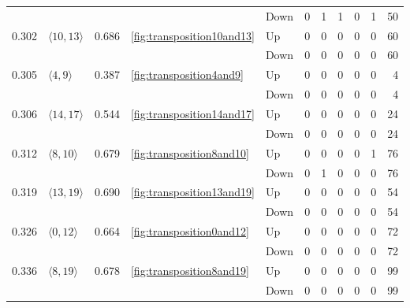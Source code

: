 \documentclass{article}
\begin{document}
\begin{center}
\begin{tabular}{lllllrrrrrr}
 &  &  &  & Down & 0 & 1 & 1 & 0 & 1 & 50 \\
\cline{1-11} \cline{2-11} \cline{3-11} \cline{4-11}
\multirow[t]{2}{*}{0.302} & \multirow[t]{2}{*}{$\langle10, 13\rangle$} & \multirow[t]{2}{*}{0.686} & \multirow[t]{2}{*}{\ref{fig:transposition10and13}} & Up & 0 & 0 & 0 & 0 & 0 & 60 \\
 &  &  &  & Down & 0 & 0 & 0 & 0 & 0 & 60 \\
\cline{1-11} \cline{2-11} \cline{3-11} \cline{4-11}
\multirow[t]{2}{*}{0.305} & \multirow[t]{2}{*}{$\langle4, 9\rangle$} & \multirow[t]{2}{*}{0.387} & \multirow[t]{2}{*}{\ref{fig:transposition4and9}} & Up & 0 & 0 & 0 & 0 & 0 & 4 \\
 &  &  &  & Down & 0 & 0 & 0 & 0 & 0 & 4 \\
\cline{1-11} \cline{2-11} \cline{3-11} \cline{4-11}
\multirow[t]{2}{*}{0.306} & \multirow[t]{2}{*}{$\langle14, 17\rangle$} & \multirow[t]{2}{*}{0.544} & \multirow[t]{2}{*}{\ref{fig:transposition14and17}} & Up & 0 & 0 & 0 & 0 & 0 & 24 \\
 &  &  &  & Down & 0 & 0 & 0 & 0 & 0 & 24 \\
\cline{1-11} \cline{2-11} \cline{3-11} \cline{4-11}
\multirow[t]{2}{*}{0.312} & \multirow[t]{2}{*}{$\langle8, 10\rangle$} & \multirow[t]{2}{*}{0.679} & \multirow[t]{2}{*}{\ref{fig:transposition8and10}} & Up & 0 & 0 & 0 & 0 & 1 & 76 \\
 &  &  &  & Down & 0 & 1 & 0 & 0 & 0 & 76 \\
\cline{1-11} \cline{2-11} \cline{3-11} \cline{4-11}
\multirow[t]{2}{*}{0.319} & \multirow[t]{2}{*}{$\langle13, 19\rangle$} & \multirow[t]{2}{*}{0.690} & \multirow[t]{2}{*}{\ref{fig:transposition13and19}} & Up & 0 & 0 & 0 & 0 & 0 & 54 \\
 &  &  &  & Down & 0 & 0 & 0 & 0 & 0 & 54 \\
\cline{1-11} \cline{2-11} \cline{3-11} \cline{4-11}
\multirow[t]{2}{*}{0.326} & \multirow[t]{2}{*}{$\langle0, 12\rangle$} & \multirow[t]{2}{*}{0.664} & \multirow[t]{2}{*}{\ref{fig:transposition0and12}} & Up & 0 & 0 & 0 & 0 & 0 & 72 \\
 &  &  &  & Down & 0 & 0 & 0 & 0 & 0 & 72 \\
\cline{1-11} \cline{2-11} \cline{3-11} \cline{4-11}
\multirow[t]{2}{*}{0.336} & \multirow[t]{2}{*}{$\langle8, 19\rangle$} & \multirow[t]{2}{*}{0.678} & \multirow[t]{2}{*}{\ref{fig:transposition8and19}} & Up & 0 & 0 & 0 & 0 & 0 & 99 \\
 &  &  &  & Down & 0 & 0 & 0 & 0 & 0 & 99 \\

\end{tabular}
\end{center}
\end{document}
